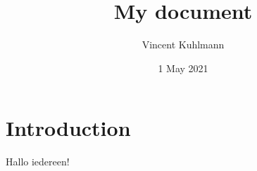 \documentclass{article}
\title{My document}
\author{Vincent Kuhlmann}
\date{1 May 2021}
\begin{document}
\maketitle
\section{Introduction}

Hallo iedereen!
\end{document}
